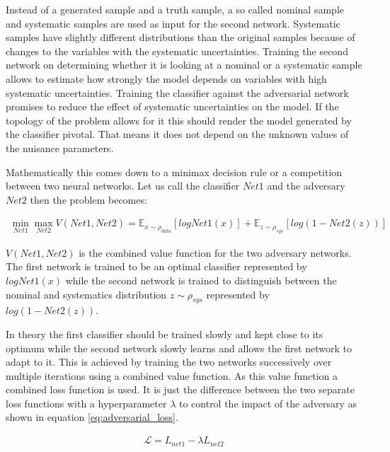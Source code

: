 Instead of a generated sample and a truth sample, a so called nominal sample and systematic samples are used as input for the second network. Systematic samples have slightly different distributions than the original samples because of changes to the variables with the systematic uncertainties. Training the second network on determining whether it is looking at a nominal or a systematic sample allows to estimate how strongly the model depends on variables with high systematic uncertainties. Training the classifier against the adversarial network promises to reduce the effect of systematic uncertainties on the model. If the topology of the problem allows for it this should render the model generated by the classifier pivotal. That means it does not depend on the unknown values of the nuisance parameters.

Mathematically this comes down to a minimax decision rule or a competition between two neural networks. Let us call the classifier $Net1$ and the adversary $Net2$ then the problem becomes:

\begin{align}
    \min_{Net1} \max_{Net2} V(Net1, Net2) = \mathbb{E}_{\mathit{x} \sim \rho_{data}} [ log Net1(\mathit{x}) ] + \mathbb{E}_{\mathit{z} \sim \rho_{sys}} [ log (1 - Net2(\mathit{z}) ) ]
\end{align}

$V(Net1, Net2)$ is the combined value function for the two adversary networks. The first network is trained to be an optimal classifier represented by $log Net1(\mathit{x})$ while the second network is trained to distinguish between the nominal and systematics distribution $\mathit{z} \sim \rho_{sys}$ represented by $log (1 - Net2(\mathit{z}))$.

 In theory the first classifier should be trained slowly and kept close to its optimum while the second network slowly learns and allows the first network to adapt to it. This is achieved by training the two networks successively over multiple iterations using a combined value function.
As this value function a combined loss function is used. It is just the difference between the two separate loss functions with a hyperparameter $\lambda$ to control the impact of the adversary as shown in equation \eqref{eq:adversarial_loss}.

\begin{align}
    \mathcal{L} = L_{net1} - \lambda L_{net2}
    \label{eq:adversarial_loss}
\end{align}

